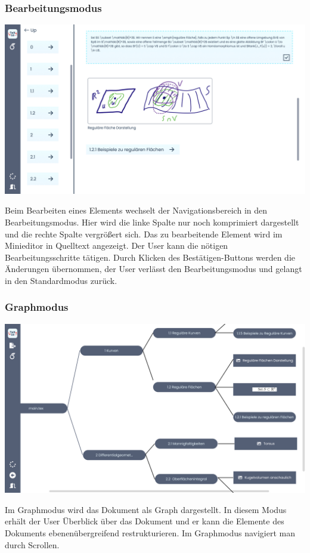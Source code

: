 \subsubsection{Bearbeitungsmodus}
\begin{minipage}
{\linewidth}

\includegraphics[width=\textwidth]{assets/img/Editor_View}

\end{minipage}
Beim Bearbeiten eines Elements wechselt der Navigationsbereich in den Bearbeitungsmodus.
Hier wird die linke Spalte nur noch komprimiert dargestellt und die rechte Spalte vergrößert sich.
Das zu bearbeitende Element wird im Minieditor in Quelltext angezeigt.
Der User kann die nötigen Bearbeitungsschritte tätigen.
Durch Klicken des Bestätigen-Buttons werden die Änderungen übernommen, der User verlässt den Bearbeitungsmodus und
gelangt in den Standardmodus zurück.

\subsubsection{Graphmodus}
\begin{minipage}
{\linewidth}

\includegraphics[width=\textwidth]{assets/img/Graphansicht}

\end{minipage}
Im Graphmodus wird das Dokument als Graph dargestellt.
In diesem Modus erhält der User Überblick über das Dokument und er kann die Elemente des Dokuments ebenenübergreifend
restrukturieren.
Im Graphmodus navigiert man durch Scrollen.

